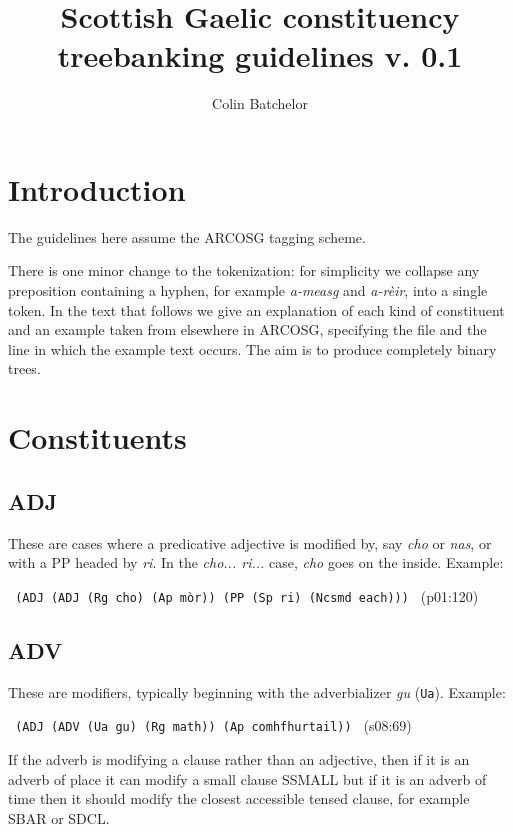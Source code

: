 \documentclass[a4paper]{article}
\begin{document}
\title{Scottish Gaelic constituency treebanking guidelines v. 0.1}
\author{Colin Batchelor}
\maketitle

\tableofcontents
\section{Introduction}

The guidelines here assume the ARCOSG tagging scheme.

There is one minor change to the tokenization: for simplicity we collapse any preposition containing a hyphen, for example \textit{a-measg} and \textit{a-r\`eir}, into a single token.
In the text that follows we give an explanation of each kind of constituent and an example taken from elsewhere in ARCOSG, specifying the file and the line in which the example text occurs.
The aim is to produce completely binary trees.

\section{Constituents}

\subsection{ADJ}

These are cases where a predicative adjective is modified by, say \textit{cho} or \textit{nas}, or with a PP headed by \textit{ri}.
In the \textit{cho... ri...} case, \textit{cho} goes on the inside.
Example:

\texttt{
(ADJ (ADJ (Rg cho) (Ap m\`or)) (PP (Sp ri) (Ncsmd each)))
} (p01:120)

\subsection{ADV}

These are modifiers, typically beginning with the adverbializer \textit{gu} (\texttt{Ua}).
Example:

\texttt{
(ADJ (ADV (Ua gu) (Rg math)) (Ap comhfhurtail))
} (s08:69)

If the adverb is modifying a clause rather than an adjective, then if it is an adverb of place it can modify a small clause SSMALL but if it is an adverb of time then it should modify the closest accessible tensed clause, for example SBAR or SDCL.
\end{document}

